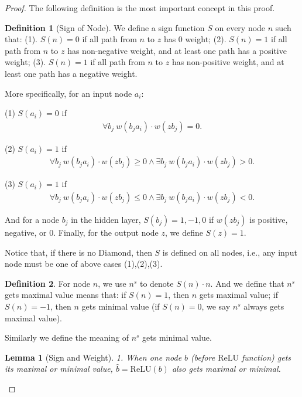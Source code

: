 \documentclass[]{article}
\newtheorem{lemma}{Lemma}
\theoremstyle{definition}
\newtheorem{definition}{Definition}
\newcommand{\ReLU}{\mathrm{ReLU}}
\begin{document}
\begin{proof} 

The following definition is the most important concept in this proof.

\begin{definition}[Sign of Node]
	We define a sign function $S$ on every node $n$ such that: 	(1). $S(n)=0$ if all path from $n$ to $z$ has 0 weight; (2). $S(n)=1$ if all path from $n$ to $z$ has non-negative weight, and at least one path has a positive weight; (3). $S(n)=1$ if all path from $n$ to $z$ has non-positive weight, and at least one path has a negative weight. 
	
	More specifically, for an input node $a_i$:
	
	(1) $S(a_i)=0$ if \begin{align}
		\forall b_j\ w(b_ja_i)\cdot w(zb_j) = 0.
	\end{align}
	
	(2) $S(a_i)=1$ if\begin{align}
		\forall b_j\ w(b_ja_i)\cdot w(zb_j) \geq 0 \wedge \exists b_j\ w(b_ja_i)\cdot w(zb_j) > 0. 
	\end{align}
	
	(3) $S(a_i)=1$ if \begin{align}
	\forall b_j\ w(b_ja_i)\cdot w(zb_j) \leq 0 \wedge \exists b_j\ w(b_ja_i)\cdot w(zb_j) < 0. 
\end{align}	 

And for a node $b_j$ in the hidden layer, $S(b_j)=1,-1,0$ if $w(zb_j)$ is positive, negative, or 0. Finally, for the output node $z$, we define $S(z)=1$.
\end{definition}

Notice that, if there is no Diamond, then $S$ is defined on all nodes, i.e., any input node must be one of above cases (1),(2),(3).

\begin{definition}
	For node $n$, we use $n^s$ to denote $S(n)\cdot n$. And we define that $n^s$ gets maximal value means that: if $S(n)=1$, then $n$ gets maximal value; if $S(n)=-1$, then $n$ gets minimal value (if $S(n)=0$, we say $n^s$ always gets maximal value).
	
	Similarly we define the meaning of $n^s$ gets minimal value.  
\end{definition}

\begin{lemma}[Sign and Weight]
	1. When one node $b$ (before $\ReLU$ function) gets its maximal or minimal value, $\hat{b}=\ReLU(b)$ also gets maximal or minimal.
	

\end{lemma}
\end{proof}
\end{document}
